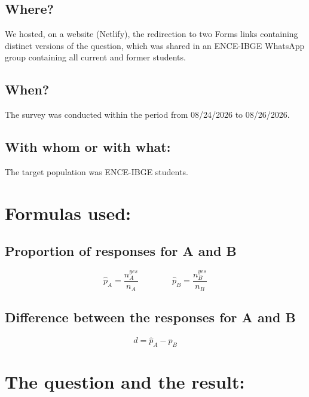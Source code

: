 \documentclass[12pt]{article}
\begin{document}
\subsection{Where?}

We hosted, on a website (Netlify), the redirection to two Forms links containing distinct versions of the question, which was shared in an ENCE-IBGE WhatsApp group containing all current and former students.

\subsection{When?}

The survey was conducted within the period from 08/24/2026 to 08/26/2026.

\subsection{With whom or with what:}

The target population was ENCE-IBGE students.

\begin{center}
\vfill
\thepage
\end{center}
\newpage

\section{Formulas used:}

\subsection{Proportion of responses for A and B}

\begin{equation}
\hat{p}_A = \frac{n_A^{yes}}{n_A} \qquad\qquad \hat{p}_B = \frac{n_B^{yes}}{n_B}
\end{equation}

\subsection{Difference between the responses for A and B}

\begin{equation}
d = \hat{p}_A - \hat{p}_B
\end{equation}

\section{The question and the result:}
\end{document}
